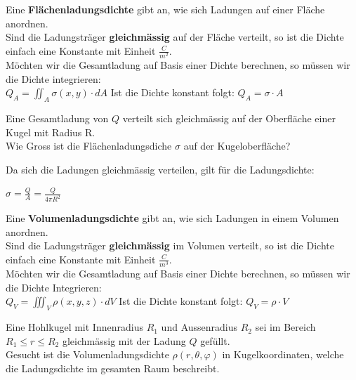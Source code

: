 \beginip
Eine \textbf{Flächenladungsdichte} gibt an, wie sich Ladungen auf einer Fläche anordnen. \\
Sind die Ladungsträger \textbf{gleichmässig} auf der Fläche verteilt, so ist die Dichte einfach eine Konstante mit Einheit $\frac{C}{m^2}$. \\
Möchten wir die Gesamtladung auf Basis einer Dichte berechnen, so müssen wir die Dichte integrieren: \\
\formulaBegin
	$\displaystyle Q_{A} = \iint_A \sigma (x,y) \cdot dA$
\formulaEnd
Ist die Dichte konstant folgt:
\formulaBegin
	$\displaystyle Q_{A} = \sigma \cdot A$
\formulaEnd
\iend







\beginbsp
	Eine Gesamtladung von $Q$ verteilt sich gleichmässig auf der Oberfläche einer Kugel mit Radius R. \\
	Wie Gross ist die Flächenladungsdiche $\sigma$ auf der Kugeloberfläche?
\iend


\beginbsp
	Da sich die Ladungen gleichmässig verteilen, gilt für die Ladungsdichte:
	\begin{center}
		$\displaystyle \sigma = \frac{Q}{A} = \frac{Q}{4\pi R^2}$
	\end{center}
\iend






\newpage

\beginip
Eine \textbf{Volumenladungsdichte} gibt an, wie sich Ladungen in einem Volumen anordnen. \\
Sind die Ladungsträger \textbf{gleichmässig} im Volumen verteilt, so ist die Dichte einfach eine Konstante mit Einheit $\frac{C}{m^3}$. \\
Möchten wir die Gesamtladung auf Basis einer Dichte berechnen, so müssen wir die Dichte Integrieren: \\
\formulaBegin
	$\displaystyle Q_{V} = \iiint_V \rho (x,y,z) \cdot dV$
\formulaEnd
Ist die Dichte konstant folgt:
\formulaBegin
	$\displaystyle Q_{V} = \rho \cdot V$
\formulaEnd
\iend




\beginbsp
Eine Hohlkugel mit Innenradius $R_1$ und Aussenradius $R_2$ sei im Bereich $ R_1 \leq r \leq R_2$ gleichmässig mit der Ladung $Q$ gefüllt. \\
Gesucht ist die Volumenladungsdichte $\rho(r,\theta,\varphi)$ in Kugelkoordinaten, welche die Ladungsdichte im gesamten Raum beschreibt.
\iend


